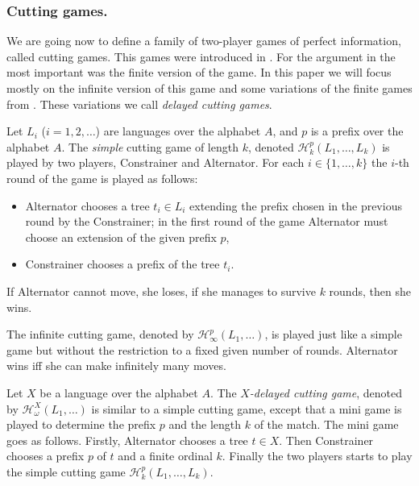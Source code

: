 \subsubsection*{Cutting games.}
We are going now to define a family of two-player games of perfect information, called cutting games. This games were
introduced in \cite{bp}. For the argument in \cite{bp} the most important was the finite version of the game. In this paper 
we will focus mostly on the infinite version of this game and some variations of the finite games from \cite{bp}. These variations we call \emph{delayed cutting games}. 

Let $L_i$ ($i=1,2,\dots$) are languages over the alphabet $A$, and $p$ is a prefix over the alphabet $A$. 
The \emph{simple} cutting game of length $k$, denoted $\mathcal{H}^p_k(L_1,\ldots,L_k)$ is played by two players, Constrainer and Alternator. 
For each $i \in \{1, \dots, k \}$ the $i$-th round of the game is played as follows:
\begin{itemize}
\item Alternator chooses a tree $t_i \in L_i$ extending the prefix chosen in the previous round by the Constrainer; in the first round of the game Alternator must choose an extension of the given prefix $p$,
\item Constrainer chooses a prefix of the tree $t_i$.
\end{itemize}
If Alternator cannot move, she loses, if she manages to survive $k$ rounds, then she wins.

The infinite cutting game, denoted by $\mathcal{H}^p_\infty(L_1,\dots)$, is played just like a simple game but without the restriction to a fixed given number of rounds. Alternator wins iff she can make infinitely many moves.

Let $X$ be a language over the alphabet $A$.  The \emph{$X$-delayed cutting game}, denoted by 
$\mathcal{H}^{X}_\omega(L_1,\dots)$ is similar to a simple cutting game, except that a mini game is played to determine the prefix $p$ and the length $k$ of the match. 
The mini game goes as follows. Firstly, Alternator chooses a tree $t \in X$. Then Constrainer chooses a prefix $p$ of $t$ and a finite ordinal $k$. Finally the two players starts to play the simple cutting game $\mathcal{H}^p_k(L_1,\dots,L_k)$. 

